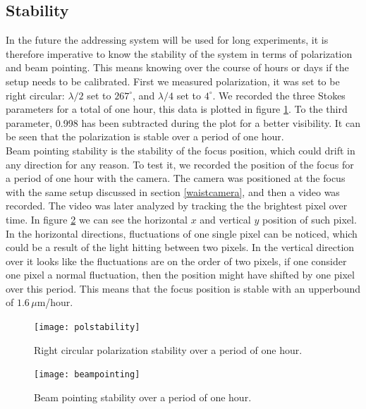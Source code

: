 \subsection{Stability}
\label{sec:stability}
In the future the addressing system will be used for long experiments, it is therefore imperative to know the stability of the system in terms of polarization and beam pointing.
This means knowing over the course of hours or days if the setup needs to be calibrated. First we measured polarization, it was set to be right circular: $\lambda/2$ set to $267^\circ$, and $\lambda/4$ set to $4^\circ$. We recorded the three Stokes parameters for a total of one hour, this data is plotted in figure \ref{polstability}. To the third parameter, 0.998 has been subtracted during the plot for a better visibility. It can be seen that the polarization is stable over a period of one hour.\\
Beam pointing stability is the stability of the focus position, which could drift in any direction for any reason. To test it, we recorded the position of the focus for a period of one hour with the camera. The camera was positioned at the focus with the same setup discussed in section \ref{waistcamera}, and then a video was recorded. The video was later analyzed by tracking the the brightest pixel over time. In figure \ref{beampointing} we can see the horizontal $x$ and vertical $y$ position of such pixel. In the horizontal directions, fluctuations of one single pixel can be noticed, which could be a result of the light hitting between two pixels. In the vertical direction over it looks like the fluctuations are on the order of two pixels, if one consider one pixel a normal fluctuation, then the position might have shifted by one pixel over this period. This means that the focus position is stable with an upperbound of $1.6\,\mu$m/hour.

\begin{figure}[H]
\centering
\texttt{[image: polstability]}
\caption{Right circular polarization stability over a period of one hour.}
\label{polstability}
\end{figure}

\begin{figure}[H]
\centering
\texttt{[image: beampointing]}
\caption{Beam pointing stability over a period of one hour.}
\label{beampointing}
\end{figure}


\newpage
